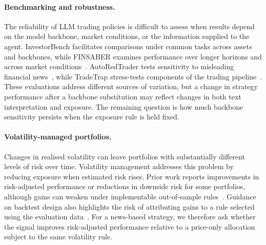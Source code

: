 \paragraph{Benchmarking and robustness.}
The reliability of LLM trading policies is difficult to assess when results depend on the model backbone, market conditions, or the information supplied to the agent. InvestorBench facilitates comparisons under common tasks across assets and backbones, while FINSABER examines performance over longer horizons and across market conditions~\cite{li2024investorbench,li2025finsaber}. AutoRedTrader tests sensitivity to misleading financial news~\cite{liu2026autoredtrader}, while TradeTrap stress-tests components of the trading pipeline~\cite{tradetrap2025}. These evaluations address different sources of variation, but a change in strategy performance after a backbone substitution may reflect changes in both text interpretation and exposure. The remaining question is how much backbone sensitivity persists when the exposure rule is held fixed.

\paragraph{Volatility-managed portfolios.}
Changes in realised volatility can leave portfolios with substantially different levels of risk over time. Volatility management addresses this problem by reducing exposure when estimated risk rises. Prior work reports improvements in risk-adjusted performance or reductions in downside risk for some portfolios, although gains can weaken under implementable out-of-sample rules~\cite{moreira2017volmanaged,harvey2018impact,cederburg2020volmanaged}. Guidance on backtest design also highlights the risk of attributing gains to a rule selected using the evaluation data~\cite{lopezdeprado2018advances}. For a news-based strategy, we therefore ask whether the signal improves risk-adjusted performance relative to a price-only allocation subject to the same volatility rule.
